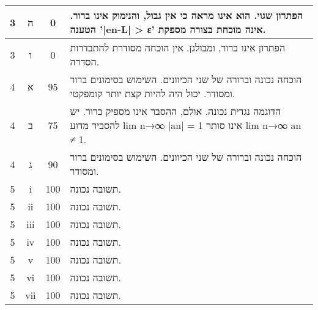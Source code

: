 \documentclass{article}
\begin{document}
\begin{RTL}
\begin{tabular}{|c|c|c|p{10cm}|}
3 & ה & 0 & הפתרון שגוי.  הוא אינו מראה  כי אין גבול,  והנימוק אינו ברור.  הטענה  '|en-L| > ε' אינה מוכחת בצורה מספקת. \\ \hline
3 & ו & 0 & הפתרון אינו ברור, ומבולגן.  אין הוכחה מסודרת  להתבדרות הסדרה. \\ \hline
4 & א & 95 & הוכחה נכונה וברורה של שני הכיוונים.  השימוש בסימונים ברור ומסודר.  יכול היה להיות קצת יותר קומפקטי. \\ \hline
4 & ב & 75 & הדוגמה נגדית נכונה.  אולם, ההסבר אינו מספיק ברור.  יש להסביר מדוע  lim n→∞ |an| = 1  אינו סותר  lim n→∞ an ≠ 1. \\ \hline
4 & ג & 90 & הוכחה נכונה וברורה של שני הכיוונים.  השימוש בסימונים ברור ומסודר. \\ \hline
5 & i & 100 & תשובה נכונה. \\ \hline
5 & ii & 100 & תשובה נכונה. \\ \hline
5 & iii & 100 & תשובה נכונה. \\ \hline
5 & iv & 100 & תשובה נכונה. \\ \hline
5 & v & 100 & תשובה נכונה. \\ \hline
5 & vi & 100 & תשובה נכונה. \\ \hline
5 & vii & 100 & תשובה נכונה. \\ \hline
\end{tabular}
\end{RTL}
\end{document}
